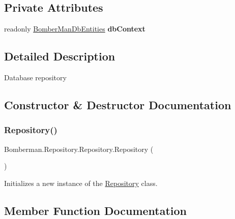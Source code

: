 \subsection*{Private Attributes}
\begin{DoxyCompactItemize}
\item 
\mbox{\label{class_bomberman_1_1_repository_1_1_repository_a033b2a5fbc75ea920d97487172669963}} 
readonly \mbox{\hyperlink{class_bomberman_1_1_data_1_1_bomber_man_db_entities}{Bomber\+Man\+Db\+Entities}} {\bfseries db\+Context}
\end{DoxyCompactItemize}


\subsection{Detailed Description}
Database repository 



\subsection{Constructor \& Destructor Documentation}
\mbox{\label{class_bomberman_1_1_repository_1_1_repository_aec1133214e470bf4e1f49fb97aa07870}} 
\subsubsection{\texorpdfstring{Repository()}{Repository()}}
{\footnotesize\ttfamily Bomberman.\+Repository.\+Repository.\+Repository (\begin{DoxyParamCaption}{ }\end{DoxyParamCaption})\hspace{0.3cm}{\ttfamily [inline]}}



Initializes a new instance of the \mbox{\hyperlink{class_bomberman_1_1_repository_1_1_repository}{Repository}} class. 



\subsection{Member Function Documentation}
\mbox{\label{class_bomberman_1_1_repository_1_1_repository_a3374580de7f0c6859a95e87813d85983}} 

